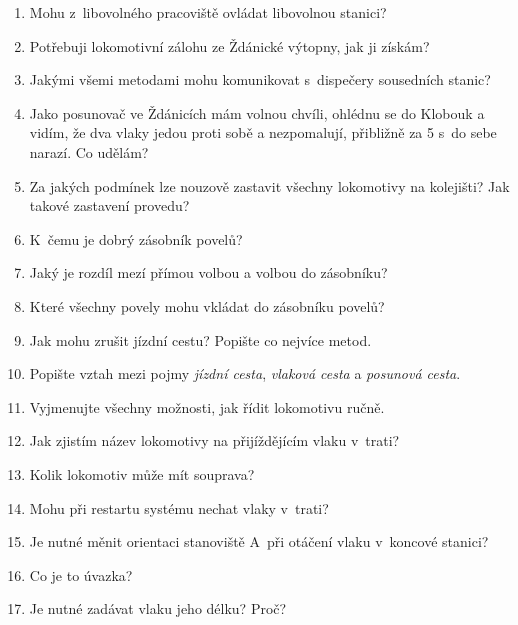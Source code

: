 \documentclass[12pt,a4paper]{article}
\begin{document}
\begin{enumerate}
	\item Mohu z~libovolného pracoviště ovládat libovolnou stanici?
	
	\item Potřebuji lokomotivní zálohu ze Ždánické výtopny, jak ji získám?
	
	\item Jakými všemi metodami mohu komunikovat s~dispečery sousedních stanic?
	
	\item Jako posunovač ve Ždánicích mám volnou chvíli, ohlédnu se do Klobouk a vidím, že dva vlaky jedou proti sobě a nezpomalují, přibližně za 5 s~do sebe narazí. Co udělám?
	
	\item Za jakých podmínek lze nouzově zastavit všechny lokomotivy na kolejišti? Jak takové zastavení provedu?
	
	\item K~čemu je dobrý zásobník povelů?
	
	\item Jaký je rozdíl mezí přímou volbou a volbou do zásobníku?
	
	\item Které všechny povely mohu vkládat do zásobníku povelů?
	
	\item Jak mohu zrušit jízdní cestu? Popište co nejvíce metod.
	
	\item Popište vztah mezi pojmy \textit{jízdní cesta}, \textit{vlaková cesta} a \textit{posunová cesta}.
	
	\item Vyjmenujte všechny možnosti, jak řídit lokomotivu ručně.
	
	\item Jak zjistím název lokomotivy na přijíždějícím vlaku v~trati?
	
	\item Kolik lokomotiv může mít souprava?
	
	\item Mohu při restartu systému nechat vlaky v~trati?
	
	\item Je nutné měnit orientaci stanoviště A~při otáčení vlaku v~koncové stanici?
	
	\item Co je to úvazka?
	
	\item Je nutné zadávat vlaku jeho délku? Proč?
	

\end{enumerate}
\end{document}
